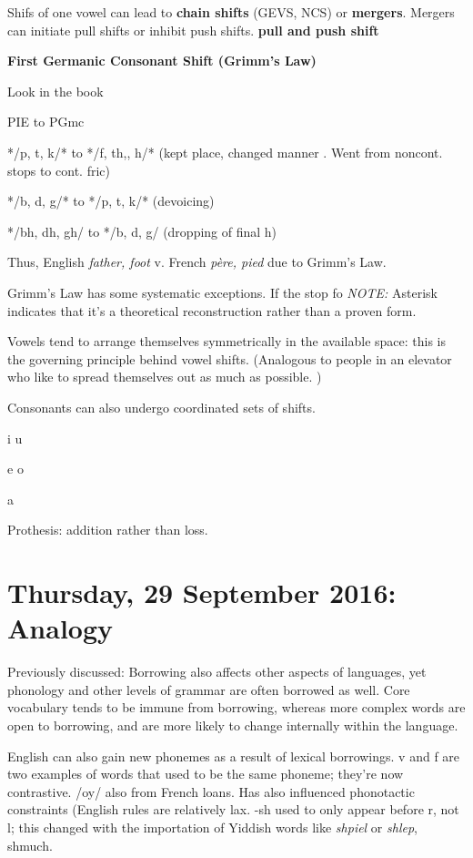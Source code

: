 \documentclass{exam}
\begin{document}
Shifs of one vowel can lead to \textbf{chain shifts} (GEVS, NCS) or \textbf{mergers}. Mergers can initiate pull shifts or inhibit push shifts. 
\textbf{pull and push shift}

\textbf{First Germanic Consonant Shift (Grimm's Law)}

Look in the book
\begin{center}
    

PIE to PGmc

*/p, t, k/* to */f, th,, h/* (kept place, changed manner . Went from noncont. stops to cont. fric)

*/b, d, g/* to */p, t, k/* (devoicing)

*/bh, dh, gh/ to */b, d, g/ (dropping of final h)



\end{center}



Thus, English \textit{father, foot} v. French \textit{père, pied} due to Grimm's Law.

Grimm's Law has some systematic exceptions. 
If the stop fo
\textit{NOTE:} Asterisk indicates that it's a theoretical reconstruction rather than a proven form. 


Vowels tend to arrange themselves symmetrically in the available space: this is the governing principle behind vowel shifts. (Analogous to people in an elevator who like to spread themselves out as much as possible. )

Consonants can also undergo coordinated sets of shifts. 
 
i  u

e  o
  
  a
  
 

Prothesis: addition rather than loss.

\section*{Thursday, 29 September 2016: Analogy}

Previously discussed: Borrowing also affects other aspects of languages, yet phonology and other levels of grammar are often borrowed as well. Core vocabulary tends to be immune from borrowing, whereas more complex words are open to borrowing, and are more likely to change internally within the language. 

English can also gain new phonemes as a result of lexical borrowings. v and f are two examples of words that used to be the same phoneme; they're now contrastive. /oy/ also from French loans. Has also influenced phonotactic constraints (English rules are relatively lax. -sh used to only appear before r, not l; this changed with the importation of Yiddish words like \textit{shpiel} or \textit{shlep}, shmuch.
\end{document}
